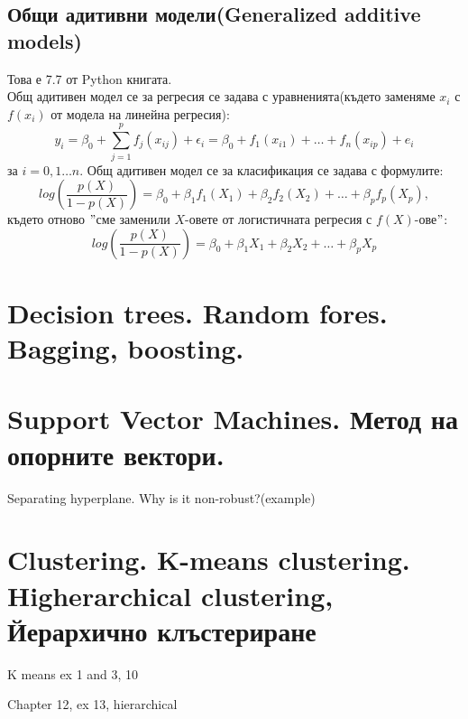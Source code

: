 \documentclass{article}
\begin{document}
\subsection{Общи адитивни модели(Generalized additive models)}
Това е 7.7 от Python книгата. \\

Общ адитивен модел се за регресия се задава с уравненията(където заменяме $x_i$ с $f(x_i)$ от модела на линейна регресия):
$$y_i = \beta_0 + \sum_{j=1}^p f_j(x_{ij}) + \epsilon_i = \beta_0 + f_1(x_{i1}) + \dots + f_n(x_{ip}) + e_i $$
за $i = 0,1 \dots n$.
Общ адитивен модел се за класификация се задава с формулите:
$$ log(\frac{p(X)}{1-p(X)}) = \beta_0 + \beta_1 f_1(X_1) + \beta_2 f_2(X_2) + \dots + \beta_p f_p(X_p),$$
където отново $"$сме заменили $X$-овете от логистичната регресия с $f(X)$-ове$"$:
$$ log(\frac{p(X)}{1-p(X)}) = \beta_0 + \beta_1 X_1 + \beta_2 X_2 + \dots + \beta_p X_p $$

	
\newpage	
\section{Decision trees. Random fores. Bagging, boosting.}
	
\newpage
\section{Support Vector Machines. Метод на опорните вектори.}	
Separating hyperplane. Why is it non-robust?(example) \\

	
	
	
\newpage
\section{Clustering. K-means clustering. Higherarchical clustering, Йерархично клъстериране}	

	K means ex 1 and 3, 10

	Chapter 12, ex 13, hierarchical \\ 

	\cite{hastie01statisticallearning}
	
	
	\newpage
	
	\printbibliography

%	
%	
%	
%	
	
\end{document}
